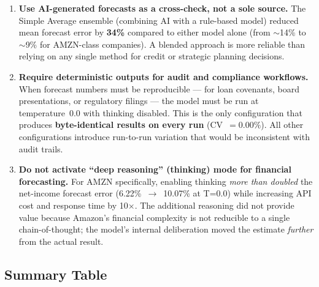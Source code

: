 \documentclass[11pt,a4paper]{article}
\begin{document}
\begin{enumerate}

  \item \textbf{Use AI-generated forecasts as a cross-check, not a sole
        source.}  The Simple Average ensemble (combining AI with a rule-based
        model) reduced mean forecast error by \textbf{34\%} compared to
        either model alone (from $\sim$14\% to $\sim$9\% for AMZN-class
        companies).  A blended approach is more reliable than relying on any
        single method for credit or strategic planning decisions.

  \item \textbf{Require deterministic outputs for audit and compliance
        workflows.}  When forecast numbers must be reproducible --- for loan
        covenants, board presentations, or regulatory filings --- the model
        must be run at temperature~0.0 with thinking disabled.  This is the
        only configuration that produces \textbf{byte-identical results on
        every run} (CV~$= 0.00\%$).  All other configurations introduce
        run-to-run variation that would be inconsistent with audit trails.

  \item \textbf{Do not activate ``deep reasoning'' (thinking) mode for
        financial forecasting.}  For AMZN specifically, enabling thinking
        \emph{more than doubled} the net-income forecast error
        (6.22\%~$\to$~10.07\% at T=0.0) while increasing API cost and
        response time by 10$\times$.  The additional reasoning did not
        provide value because Amazon's financial complexity is not reducible
        to a single chain-of-thought; the model's internal deliberation
        moved the estimate \emph{further} from the actual result.

\end{enumerate}

\subsection*{Summary Table}
\end{document}
